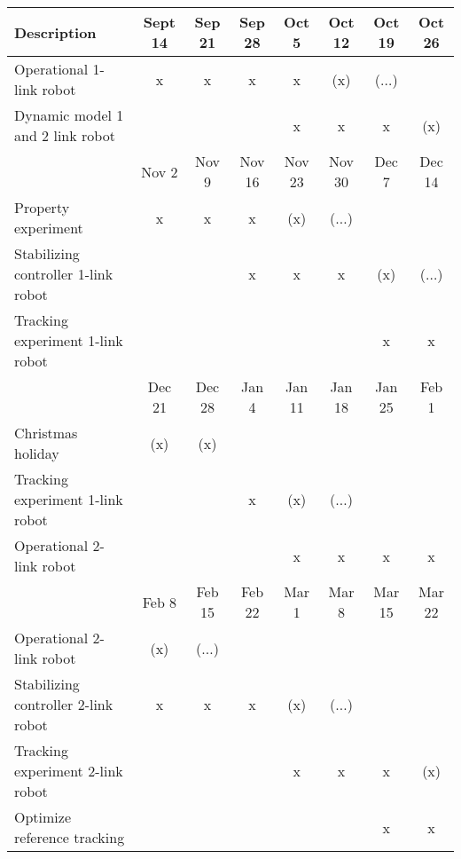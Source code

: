 \begin{table}[H]
    \centering
    \begin{tabular}{p{5cm}ccccccc} \hline
      \textbf{Description}        & Sept 14 &Sep 21 & Sep 28 & Oct 5 & Oct 12  & Oct 19 & Oct 26 \\ \hline
      Operational 1-link robot    & x      & x     & x      & x   & (x)   & ($\dots$)      &     \\ 
      Dynamic model 1 and 2 link robot  &        &       &        &  x      & x      & x     &  (x)   \\  \hline       
 
                                  & Nov 2 & Nov 9 & Nov 16 & Nov 23 & Nov 30 & Dec 7 & Dec 14 \\ \hline
     Property experiment          & x      & x   & x     & (x)    & ($\dots$)  &  &               \\    
     Stabilizing controller 1-link robot &  &         & x    & x    & x    & (x)      &  ($\dots$)        \\      
     Tracking experiment 1-link robot  &        &       &        &        &      & x     & x  \\ \hline 
      
                                   & Dec 21 & Dec 28 & Jan 4 & Jan 11 & Jan 18 & Jan 25 & Feb 1   \\ \hline
         Christmas holiday            &  (x)   &    (x)     &          &    &     &        &           \\   
     Tracking experiment 1-link robot  &  &         &   x    &  (x)&  ($\dots$)    &       &          \\ 
    Operational 2-link robot        &    &         &      &  x     &    x    & x      & x        \\    \hline  
      
                                  & Feb 8 & Feb 15 & Feb 22 & Mar 1 & Mar 8 & Mar 15 & Mar 22  \\ \hline
     Operational 2-link robot        & (x)   &     ($\dots$)    &      &      &        &       &         \\ 
     Stabilizing controller 2-link robot & x &  x   &    x     &   (x)    & ($\dots$) &      &   \\ 
    Tracking experiment 2-link robot &    &  &      & x   &    x    &   x     &     (x)     \\ 
    Optimize reference tracking      &    &           &          &      &  &      x  &   x \\ \hline




\end{tabular}
\end{table}
